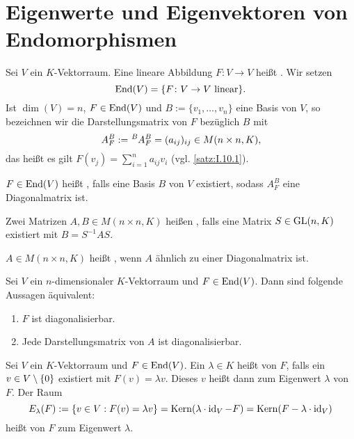\section{Eigenwerte und Eigenvektoren von Endomorphismen}

\setcounter{definition}{1}
\begin{definition}
	\label{def:I.16.2}
	Sei $V$ ein $K$-Vektorraum.
	Eine lineare Abbildung $F \colon V \rightarrow V$ heißt .
	Wir setzen
	\[
		\operatorname{End}(V) = \{F \colon V \rightarrow V \text{ linear}\}.
	\]
	Ist $\dim(V) = n$, $F \in \operatorname{End}(V)$ und $B := \{v_1,\dots,v_n\}$ eine Basis von $V$, so bezeichnen wir die Darstellungsmatrix von $F$ bezüglich $B$ mit
	\[
		\mat{A}{}{B}{F} := \mat{A}{B}{B}{F} = (a_{ij})_{ij} \in M(n \times n,K),
	\]
	das heißt es gilt $F(v_j) = \sum\limits_{i=1}^{n} a_{ij}v_i$ (vgl. \autoref{satz:I.10.1}).
	
	$F \in \operatorname{End}(V)$ heißt , falls eine Basis $B$ von $V$ existiert, sodass $A^B_F$ eine Diagonalmatrix ist.
\end{definition}

\begin{definition}
	\label{def:I.16.3}
	Zwei Matrizen $A,B \in M(n \times n,K)$ heißen , falls eine Matrix $S \in \operatorname{GL}(n,K)$ existiert mit $B = S^{-1}AS$.
	
	$A \in M(n\times n,K)$ heißt , wenn $A$ ähnlich zu einer Diagonalmatrix ist.
\end{definition}

\begin{satz}
	\label{satz:I.16.4}
	Sei $V$ ein $n$-dimensionaler $K$-Vektorraum und $F \in \operatorname{End}(V)$.
	Dann sind folgende Aussagen äquivalent:
	\begin{enumerate}[(1)]
		\item $F$ ist diagonalisierbar.
		\item Jede Darstellungsmatrix von $A$ ist diagonalisierbar.
	\end{enumerate}
\end{satz}

\setcounter{definition}{6}
\begin{definition}
	\label{def:I.16.7}
	Sei $V$ ein $K$-Vektorraum und $F \in \operatorname{End}(V)$.
	Ein $\lambda \in K$ heißt  von $F$, falls ein $v \in V \setminus \{0\}$ existiert mit $F(v) = \lambda v$.
	Dieses $v$ heißt dann  zum Eigenwert $\lambda$ von $F$.
	Der Raum
	\[
		E_\lambda(F) := \{v \in V : F(v) = \lambda v\} = \operatorname{Kern}(\lambda \cdot \operatorname{id}_V - F) = \operatorname{Kern}(F - \lambda \cdot \operatorname{id}_V)
	\]
	heißt  von $F$ zum Eigenwert $\lambda$.
\end{definition}

